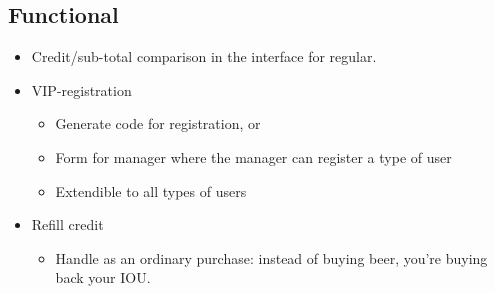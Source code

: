 \documentclass{article}
\begin{document}
\subsection{Functional}
\begin{itemize}
\item Credit/sub-total comparison in the interface for regular.
\item VIP-registration

  \begin{itemize}
  \item Generate code for registration, or
  \item Form for manager where the manager can register a type of user
  \item Extendible to all types of users

  \end{itemize}
\item Refill credit

  \begin{itemize}
  \item Handle as an ordinary purchase: instead of buying beer, you're buying back your IOU.
    

\end{itemize}
\end{itemize}
\end{document}

